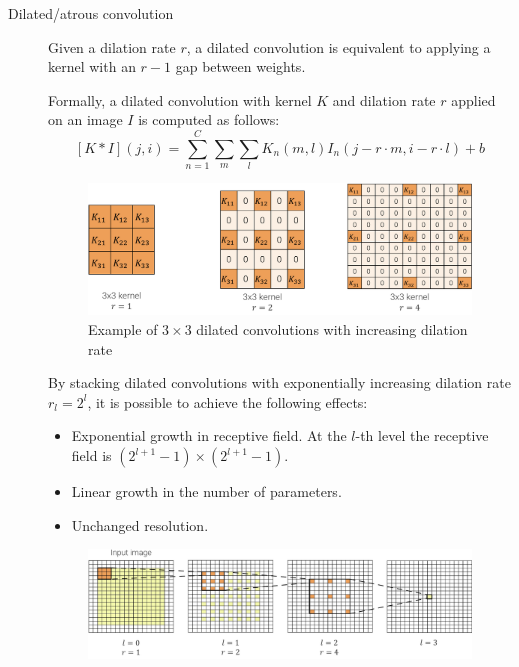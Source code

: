 \begin{description}
    \item[Dilated/atrous convolution] 
        Given a dilation rate $r$, a dilated convolution is equivalent to applying a kernel with an $r-1$ gap between weights.

        Formally, a dilated convolution with kernel $K$ and dilation rate $r$ applied on an image $I$ is computed as follows:
        \[
            [K * I](j, i) = \sum_{n=1}^{C} \sum_{m} \sum_{l} K_n(m, l) I_n(j - r \cdot m, i - r \cdot l) + b
        \]

        \begin{figure}[H]
            \centering
            \includegraphics[width=0.7\linewidth]{./img/_dilated_convolution.pdf}
            \caption{Example of $3 \times 3$ dilated convolutions with increasing dilation rate}
        \end{figure}
        
        \begin{remark}
            By stacking dilated convolutions with exponentially increasing dilation rate $r_l = 2^l$, it is possible to achieve the following effects:
            \begin{itemize}
                \item Exponential growth in receptive field. At the $l$-th level the receptive field is $(2^{l+1} - 1) \times (2^{l+1} - 1)$.
                \item Linear growth in the number of parameters.
                \item Unchanged resolution.
            \end{itemize}

            \begin{figure}[H]
                \centering
                \includegraphics[width=0.9\linewidth]{./img/_dilated_convolution_exponential.pdf}
            \end{figure}
        \end{remark}


\end{description}
